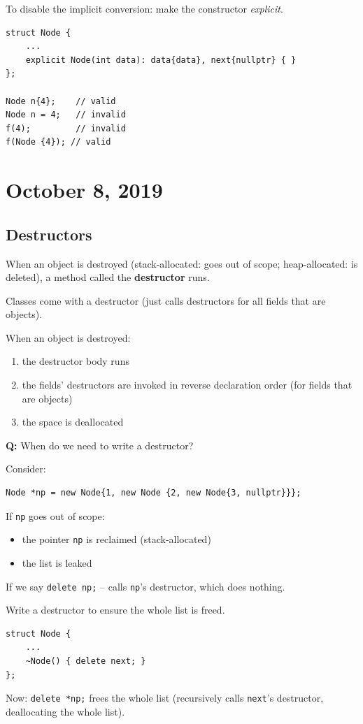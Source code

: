 \documentclass[11pt]{article}
\theoremstyle{definition}
\begin{document}
To disable the implicit conversion: make the constructor {\it explicit}. 
\begin{lstlisting}
struct Node {
    ...
    explicit Node(int data): data{data}, next{nullptr} { }
};

Node n{4};    // valid
Node n = 4;   // invalid
f(4);         // invalid
f(Node {4}); // valid
\end{lstlisting}
\newpage
\section{October 8, 2019}

\subsection{Destructors}
When an object is destroyed (stack-allocated: goes out of scope; heap-allocated: is deleted), a method called the {\bf destructor} runs. 

Classes come with a destructor (just calls destructors for all fields that are objects).

When an object is destroyed: \vspace{-0.25cm}
\begin{enumerate}
    \item the destructor body runs
    \item the fields' destructors are invoked in reverse declaration order (for fields that are objects)
    \item the space is deallocated
\end{enumerate}
{\bf Q:} When do we need to write a destructor?

Consider:
\begin{lstlisting}
Node *np = new Node{1, new Node {2, new Node{3, nullptr}}};
\end{lstlisting}
If {\tt np} goes out of scope: \vspace{-0.25cm}
\begin{itemize}
\item the pointer {\tt np} is reclaimed (stack-allocated)
\item the list is leaked
\end{itemize}
\vspace{-0.25cm}
If we say {\tt delete np;} -- calls {\tt *np}'s destructor, which does nothing.

Write a destructor to ensure the whole list is freed.
\begin{lstlisting}
struct Node {
    ...
    ~Node() { delete next; } 
};
\end{lstlisting}
Now: {\tt delete *np;} frees the whole list (recursively calls {\tt *next}'s destructor, deallocating the whole list).
\end{document}
